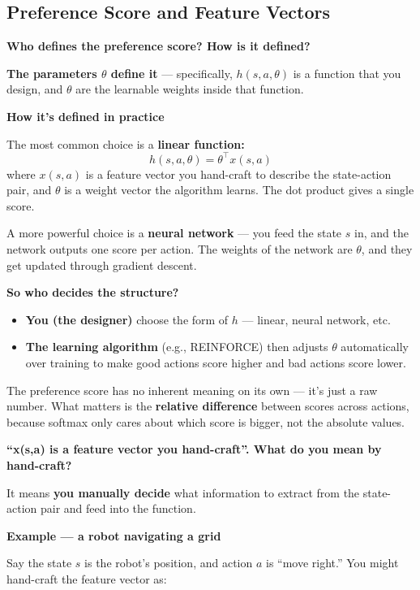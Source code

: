 \subsection{Preference Score and Feature Vectors}

\textbf{Who defines the preference score? How is it defined?}

\textbf{The parameters $\theta$ define it} --- specifically, $h(s, a, \theta)$ is a function that you design, and $\theta$ are the learnable weights inside that function.

\textbf{How it's defined in practice}

The most common choice is a \textbf{linear function:}
\[
h(s, a, \theta) = \theta^\top x(s, a)
\]
where $x(s, a)$ is a feature vector you hand-craft to describe the state-action pair, and $\theta$ is a weight vector the algorithm learns. The dot product gives a single score.

A more powerful choice is a \textbf{neural network} --- you feed the state $s$ in, and the network outputs one score per action. The weights of the network are $\theta$, and they get updated through gradient descent.

\textbf{So who decides the structure?}

\begin{itemize}
    \item \textbf{You (the designer)} choose the form of $h$ --- linear, neural network, etc.
    \item \textbf{The learning algorithm} (e.g., REINFORCE) then adjusts $\theta$ automatically over training to make good actions score higher and bad actions score lower.
\end{itemize}

The preference score has no inherent meaning on its own --- it's just a raw number. What matters is the \textbf{relative difference} between scores across actions, because softmax only cares about which score is bigger, not the absolute values.

\medskip

\textbf{``x(s,a) is a feature vector you hand-craft''. What do you mean by hand-craft?}

It means \textbf{you manually decide} what information to extract from the state-action pair and feed into the function.

\textbf{Example --- a robot navigating a grid}

Say the state $s$ is the robot's position, and action $a$ is ``move right.'' You might hand-craft the feature vector as:

